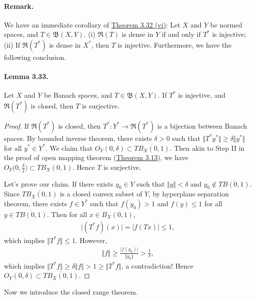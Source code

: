 \documentclass{article}
\begin{document}
\paragraph{Remark.} We have an immediate corollary of \hyperref[thm:3.32]{Theorem 3.32 (vi)}: Let $X$ and $Y$ be normed spaces, and $T\in\mathfrak{B}(X,Y)$. (i) $\mathfrak{R}(T)$ is dense in $Y$ if and only if $T^*$ is injective; (ii) If $\mathfrak{R}(T^*)$ is dense in $X^*$, then $T$ is injective. Furthermore, we have the following conclusion.

\paragraph{Lemma 3.33.\label{lemma:3.33}} Let $X$ and $Y$ be Banach spaces, and $T\in\mathfrak{B}(X,Y)$. If $T^*$ is injective, and $\mathfrak{R}(T^*)$ is closed, then $T$ is surjective.
\begin{proof}
If $\mathfrak{R}(T^*)$ is closed, then $T^*:Y^*\to\mathfrak{R}(T^*)$ is a bijection between Banach spaces. By bounded inverse theorem, there exists $\delta>0$ such that $\Vert T^*y^*\Vert\geq\delta\Vert y^*\Vert$ for all $y^*\in Y^*$. We claim that $O_{Y}(0,\delta)\subset\overline{TB_{X}(0,1)}$. Then akin to Step II in the proof of open mapping theorem (\hyperref[thm:3.13]{Theorem 3.13}), we have $O_Y\bigl(0,\frac{\delta}{2}\bigr)\subset TB_X(0,1)$. Hence $T$ is surjective.

Let's prove our claim. If there exists $y_0\in Y$ such that $\Vert y\Vert < \delta$ and $y_0\notin \overline{TB(0,1)}$. Since $\overline{TB_X(0,1)}$ is a closed convex subset of $Y$, by hyperplane separation theorem, there exists $f\in Y^*$ such that $f(y_0)>1$ and $f(y)\leq 1$ for all $y\in\overline{TB(0,1)}$. Then for all $x\in B_X(0,1)$,
\begin{align*}
	\vert (T^*f)(x)\vert = \vert f(Tx)\vert \leq 1,
\end{align*}
which implies $\Vert T^*f\Vert\leq 1$. However,
\begin{align*}
	\Vert f\Vert \geq \frac{\vert f(y_0)\vert}{\Vert y_0\Vert} > \frac{1}{\delta},
\end{align*}
which implies $\Vert T^*f\Vert \geq \delta\Vert f\Vert>1\geq \Vert T^*f\Vert$, a contradiction! Hence $O_{Y}(0,\delta)\subset\overline{TB_{X}(0,1)}$.
\end{proof}

Now we introduce the closed range theorem.
\end{document}
